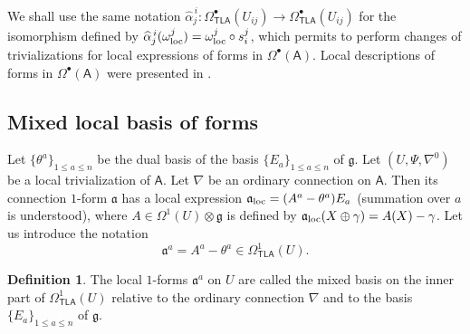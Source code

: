 \documentclass[number]{elsarticle}
\theoremstyle{definition}
\newtheorem{definition}[theorem]{Definition}
\theoremstyle{remark}
\numberwithin{equation}{section}
\begin{document}
We shall use the same notation ${\widehat{\alpha}}_{j}^{\,i} : \Omega^{\bullet}_{{{{\mathbf{\mathsf{{TLA}}}}}}}(U_{ij}) \rightarrow \Omega^{\bullet}_{{{{\mathbf{\mathsf{{TLA}}}}}}}(U_{ij})$ for the isomorphism defined by ${\widehat{\alpha}}_{j}^{\,i}(\omega^j_{{\text{\textup{loc}}}}) = \omega^j_{{\text{\textup{loc}}}} \circ s_{i}^{j}$, which permits to perform changes of trivializations for local expressions of forms in $\Omega^{\bullet}({{{{\mathbf{\mathsf{{A}}}}}}})$. Local descriptions of forms in $\Omega^{\bullet}({{{{\mathbf{\mathsf{{A}}}}}}})$ were presented in \cite{Kuba96a}.

\subsection{Mixed local basis of forms}
\label{subset-mixedlocalbasisofforms}

Let $\{\theta^a\}_{1 \leq a \leq n}$ be the dual basis of the basis $\{E_a\}_{1 \leq a \leq n}$ of ${{\mathfrak g}}$. Let $(U, \Psi, \nabla^{0})$ be a local trivialization of ${{{{\mathbf{\mathsf{{A}}}}}}}$. Let $\nabla$ be an ordinary connection on ${{{{\mathbf{\mathsf{{A}}}}}}}$. Then its connection $1$-form ${\mathfrak{a}}$ has a local expression ${\mathfrak{a}}_{{\text{\textup{loc}}}} = (A^a - \theta^a) E_a$ (summation over $a$ is understood), where $A \in \Omega^1(U)\otimes {{\mathfrak g}}$ is defined by ${\mathfrak{a}}_{{\text{\textup{loc}}}}(X \oplus \gamma) = A(X) - \gamma$. Let us introduce the notation 
\begin{equation*}
{\mathfrak{a}}^a = A^a - \theta^a \in \Omega^1_{{{{\mathbf{\mathsf{{TLA}}}}}}}(U).
\end{equation*}

\begin{definition}
\label{def-mixedbasis}
The local $1$-forms ${\mathfrak{a}}^a$ on $U$ are called the mixed basis on the inner part of $\Omega^1_{{{{\mathbf{\mathsf{{TLA}}}}}}}(U)$ relative to the ordinary connection $\nabla$ and to the basis $\{E_a\}_{1 \leq a \leq n}$ of ${{\mathfrak g}}$.
\end{definition}
\end{document}
